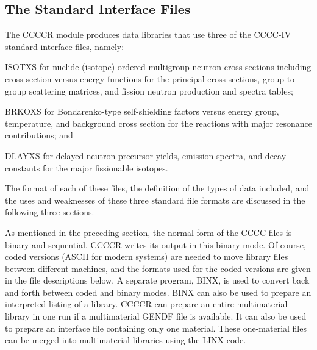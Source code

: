 \subsection{The Standard Interface Files}
\label{ssCCCCR_Interface}

The CCCCR module produces data libraries that use three of the CCCC-IV
standard interface files, namely:

\begin{description}
\begin{singlespace}

\item[ISOTXS] for nuclide (isotope)-ordered multigroup neutron
  cross sections including cross section versus energy functions
  for the principal cross sections, group-to-group scattering
  matrices, and fission neutron production and spectra tables;
\item[BRKOXS] for Bondarenko-type self-shielding factors versus
  energy group, temperature, and background cross section for
  the reactions with major resonance contributions; and
\item[DLAYXS] for delayed-neutron precursor yields, emission
  spectra, and decay constants for the major fissionable
  isotopes.

\end{singlespace}
\end{description}

\noindent
The format of each of these files, the definition of the types of data
included, and the uses and weaknesses of these three standard file
formats are discussed in the following three sections.

As mentioned in the preceding section, the normal form of the CCCC files
is binary and sequential.  CCCCR writes its output in this binary mode.
Of course, coded versions (ASCII for modern systems) are needed to move
library files between different machines, and the formats used for the
coded versions are given in the file descriptions below.  A separate
program, BINX\cite{LINXBINX}, is used to convert back and forth between
coded and binary modes.  BINX can also be used to prepare an
interpreted listing of a library.  CCCCR can prepare an entire
multimaterial library in one run if a multimaterial GENDF file is
available.  It can also be used to prepare an interface file containing
only one material.  These one-material files can be merged into
multimaterial libraries using the LINX code\cite{LINXBINX}.


